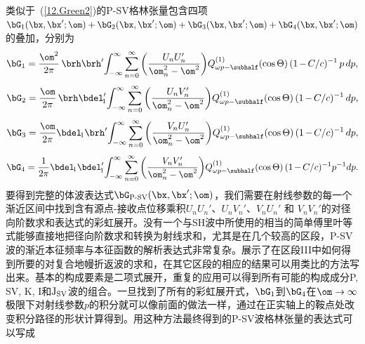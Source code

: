 类似于~(\ref{12.Green2})的P-SV格林张量包含四项$\bG_1(\bx,\bx';\om)+\bG_2(\bx,\bx';\om)+
\bG_3(\bx,\bx';\om)+\bG_4(\bx,\bx';\om)$的叠加，分别为
\begin{displaymath}
\bG_1=\frac{\om^2}{2\pi}\,\brh\brh'\!
\int_{-\infty}^{\infty}\sum_{n=0}^{\infty}
\left(\frac{U_nU_n^{\prime}}{\om_n^2-\om^2}\right)
\!Q_{\omega p-\subhalf}^{(1)}
(\cos\Theta)\,(1\hspace{-0.3 mm}-\hspace{-0.3 mm}C/c)^{-1}\,p\,dp,
\end{displaymath}
\begin{displaymath}
\bG_2=\frac{\om}{2\pi}\,\brh\bdel_{\!1}^{\prime}\!
\int_{-\infty}^{\infty}\sum_{n=0}^{\infty}
\left(\frac{U_nV_n^{\prime}}{\om_n^2-\om^2}\right)
\!Q_{\omega p-\subhalf}^{(1)}
(\cos\Theta)\,(1\hspace{-0.3 mm}-\hspace{-0.3 mm}C/c)^{-1}\,dp,
\end{displaymath}
\begin{displaymath}
\bG_3=\frac{\om}{2\pi}\bdel_{\!1}\brh'\!
\int_{-\infty}^{\infty}\sum_{n=0}^{\infty}
\left(\frac{V_nU_n^{\prime}}{\om_n^2-\om^2}\right)
\!Q_{\omega p-\subhalf}^{(1)}
(\cos\Theta)\,(1\hspace{-0.3 mm}-\hspace{-0.3 mm}C/c)^{-1}\,dp,
\end{displaymath}
\begin{displaymath}
\bG_4=\frac{1}{2\pi}\bdel_{\!1}\bdel_{\!1}^{\prime}\!
\int_{-\infty}^{\infty}\sum_{n=0}^{\infty}
\left(\frac{V_nV_n^{\prime}}{\om_n^2-\om^2}\right)
\!Q_{\omega p-\subhalf}^{(1)}
(\cos\Theta)\,(1\hspace{-0.3 mm}-\hspace{-0.3 mm}C/c)^{-1}p^{-1}dp.
\end{displaymath}
\eq
\en
要得到完整的体波表达式$\bG_{\rm P\mbox{\scriptsize -}SV}(\bx,\bx';\om)$，我们需要在射线参数的每一个渐近区间中找到含有源点-接收点位移乘积$U_nU_n'$、$U_nV_n'$、$V_nU_n'$ 和 $V_nV_n'$的对径向阶数求和表达式的彩虹展开。没有一个与SH波中所使用的相当的简单傅里叶等式能够直接地把径向阶数求和转换为射线求和，尤其是在几个较高的区段，P-SV波的渐近本征频率与本征函数的解析表达式非常复杂。\textcite{zhao&dahlen96}展示了在区段III中如何得到所要的对复合地幔折返波的求和，在其它区段的相应的结果可以用类比的方法写出来。基本的构成要素是二项式展开，重复的应用可以得到所有可能的构成成分P, SV, K, I和${\rm J}_{\rm SV}$波的组合。一旦找到了所有的彩虹展开式，$\bG_1$到$\bG_4$在$\om\rightarrow\infty$极限下对射线参数$p$的积分就可以像前面的做法一样，通过在正实轴上的鞍点处改变积分路径的形状计算得到。用这种方法最终得到的P-SV波格林张量的表达式可以写成
